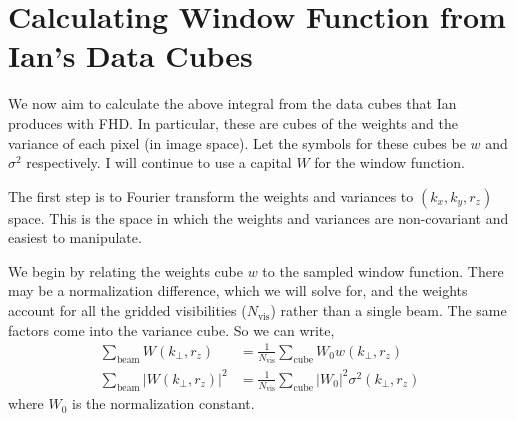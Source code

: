 \documentclass{article}
\begin{document}
\section{Calculating Window Function from Ian's Data Cubes}

We now aim to calculate the above integral from the data cubes that Ian produces with FHD. In particular, these are cubes of the weights and the variance of each pixel (in image space). Let the symbols for these cubes be $w$ and $\sigma^2$ respectively. I will continue to use a capital $W$ for the window function.

The first step is to Fourier transform the weights and variances to $(k_x,k_y,r_z)$ space. This is the space in which the weights and variances are non-covariant and easiest to manipulate.

We begin by relating the weights cube $w$ to the sampled window function. There may be a normalization difference, which we will solve for, and the weights account for all the gridded visibilities ($N_{\text{vis}}$) rather than a single beam. The same factors come into the variance cube. So we can write,
\begin{subequations} \label{eq:relate_w_to_W}
\begin{align}
\sum_{\text{beam}} W(k_{\perp},r_z) & = \frac{1}{N_{\text{vis}}} \sum_{\text{cube}} W_0 w(k_{\perp},r_z) \\
\sum_{\text{beam}} |W(k_{\perp},r_z)|^2 & = \frac{1}{N_{\text{vis}}} \sum_{\text{cube}} |W_0|^2 \sigma^2(k_{\perp},r_z)
\end{align}
\end{subequations}
where $W_0$ is the normalization constant.
\end{document}
